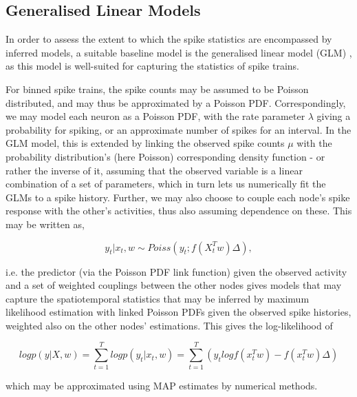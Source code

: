 \documentclass[mphil,deptreport,ianc]{infthesis} %
\begin{document}
\subsection{Generalised Linear Models}

In order to assess the extent to which the spike statistics are encompassed by inferred models, a suitable baseline model is the generalised linear model (GLM) \cite{Nelder1972, Fernandez2000}, as this model is well-suited for capturing the statistics of spike trains.

For binned spike trains, the spike counts may be assumed to be Poisson distributed, and may thus be approximated by a Poisson PDF.
Correspondingly, we may model each neuron as a Poisson PDF, with the rate parameter $\lambda$ giving a probability for spiking, or an approximate number of spikes for an interval.
In the GLM model, this is extended by linking the observed spike counts $\mu$ with the probability distribution's (here Poisson) corresponding density function - or rather the inverse of it, assuming that the observed variable is a linear combination of a set of parameters, which in turn lets us numerically fit the GLMs to a spike history.
Further, we may also choose to couple each node's spike response with the other's activities, thus also assuming dependence on these. This may be written as,

\begin{equation}
    y_t|x_t, w \sim Poiss(y_t; f(X_t^T w)\Delta),
\end{equation}

i.e. the predictor (via the Poisson PDF link function) given the observed activity and a set of weighted couplings between the other nodes gives models that may capture the spatiotemporal statistics that may be inferred by maximum likelihood estimation with linked Poisson PDFs given the observed spike histories, weighted also on the other nodes' estimations.
This gives the log-likelihood of

\begin{equation}
    log p(y|X, w) = \sum_{t=1}^T log p(y_t| x_t, w) = \sum_{t=1}^T(y_t log f(x_t^Tw) - f(x_t^Tw)\Delta)
\end{equation}

which may be approximated using MAP estimates by numerical methods.

\end{document}

